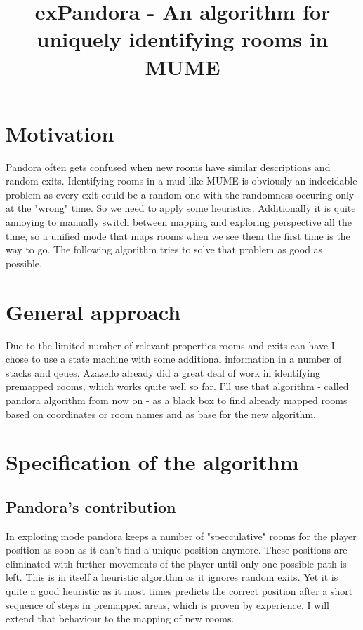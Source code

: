 \documentclass[11pt]{article}
\begin{document}
\title{exPandora - An algorithm for uniquely identifying rooms in MUME}
\maketitle

\section{Motivation}
Pandora often gets confused when new rooms have similar descriptions and random exits. 
Identifying rooms in a mud like MUME is obviously an indecidable problem as every exit could be a random one with the randomness occuring only at the "wrong"
time. So we need to apply some heuristics. Additionally it is quite annoying to manually switch
between mapping and exploring perspective all the time, so a unified mode that maps rooms when we 
see them the first time is the way to go. The following algorithm tries to solve that problem as good
as possible.

\section{General approach}
Due to the limited number of relevant properties rooms and exits can have I chose to use a state
machine with some additional information in a number of stacks and qeues. Azazello already did a
great deal of work in
identifying premapped rooms, which works quite well so far. I'll use that algorithm - called
pandora algorithm from now on - as a black box to find already mapped rooms based on coordinates or
room names and as base for the new algorithm.

\section{Specification of the algorithm}
\subsection{Pandora's contribution}
In exploring mode pandora keeps a number of "specculative" rooms for the player position as soon
as it can't find a unique position anymore. These positions are eliminated with further movements
of the player until only one possible path is left. This is in itself a heuristic algorithm as it
ignores random exits. Yet it is quite a good heuristic as it most times predicts the correct
position after a short sequence of steps in premapped areas, which is proven by experience. I will
extend that behaviour to the mapping of new rooms.
\end{document}
